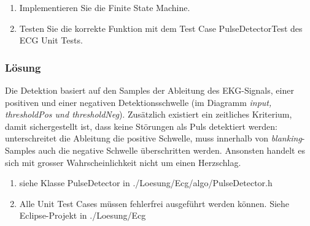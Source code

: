\begin{enumerate}
  \item Implementieren Sie die Finite State Machine.
  \item Testen Sie die korrekte Funktion mit dem Test Case PulseDetectorTest des ECG Unit Tests.
\end{enumerate}

\subsubsection{Lösung}

Die Detektion basiert auf den Samples der Ableitung des EKG-Signals, einer positiven und einer negativen Detektionsschwelle (im Diagramm \textit{input, thresholdPos und thresholdNeg}). Zusätzlich existiert ein zeitliches Kriterium, damit sichergestellt ist, dass keine Störungen als Puls detektiert werden: unterschreitet die Ableitung die positive Schwelle, muss innerhalb von \textit{blanking}-Samples auch die negative Schwelle überschritten werden. Ansonsten handelt es sich mit grosser Wahrscheinlichkeit nicht um einen Herzschlag.

\begin{enumerate}
  \item siehe Klasse PulseDetector in ./Loesung/Ecg/algo/PulseDetector.h
  \item Alle Unit Test Cases müssen fehlerfrei ausgeführt werden können. Siehe Eclipse-Projekt in ./Loesung/Ecg
\end{enumerate}


